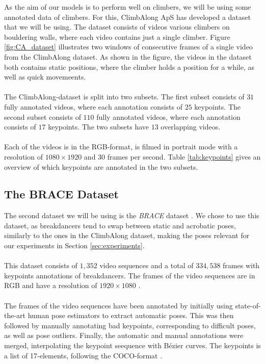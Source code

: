 \documentclass[./main.tex]{subfiles}
\begin{document}
As the aim of our models is to perform well on climbers, we will be using some annotated data of climbers. For this, ClimbAlong ApS has developed a dataset that we will be using. The dataset consists of videos various climbers on bouldering walls, where each video contains just a single climber. Figure \ref{fig:CA_dataset} illustrates two windows of consecutive frames of a single video from the ClimbAlong dataset. As shown in the figure, the videos in the dataset both contains static positions, where the climber holds a position for a while, as well as quick movemeents.
\\
\\
The ClimbAlong-dataset is split into two subsets. The first subset consists of $31$ fully annotated videos, where each annotation consists of $25$ keypoints. The second subset consists of $110$ fully annotated videos, where each annotation consists of $17$ keypoints. The two subsets have $13$ overlapping videos.
\\
\\
Each of the videos is in the RGB-format, is filmed in portrait mode with a resolution of $1080 \times 1920$ and $30$ frames per second. Table \ref{tab:keypoints} gives an overview of which keypoints are annotated in the two subsets. 

\subsection{The BRACE Dataset}
The second dataset we will be using is the \textit{BRACE} dataset \cite{BRACE}. We chose to use this dataset, as breakdancers tend to swap between static and acrobatic poses, similarly to the ones in the ClimbAlong dataset, making the poses relevant for our experiments in Section \ref{sec:experiments}.
\\
\\
This dataset consists of $1,352$ video sequences and a total of $334,538$ frames with keypoints annotations of breakdancers. The frames of the video sequences are in RGB and have a resolution of $1920 \times 1080$ \cite{BRACE}.
\\
\\
The frames of the video sequences have been annotated by initially using state-of-the-art human pose estimators to extract automatic poses. This was then followed by manually annotating bad keypoints, corresponding to difficult poses, as well as pose outliers. Finally, the automatic and manual annotations were merged, interpolating the keypoint seequence with Bézier curves. The keypoints is a list of 17-elements, following the COCO-format \cite{BRACE}.
\end{document}
